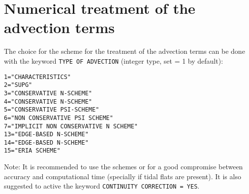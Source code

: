 \section{Numerical treatment of the advection terms}
The choice for the scheme for the treatment of the advection terms can be done with the keyword \texttt{TYPE OF ADVECTION} (integer type, set {\ttfamily = 1} by default):
\begin{lstlisting}[frame=trBL]  
1="CHARACTERISTICS" 
2="SUPG" 
3="CONSERVATIVE N-SCHEME"
4="CONSERVATIVE N-SCHEME"
5="CONSERVATIVE PSI-SCHEME"
6="NON CONSERVATIVE PSI SCHEME"
7="IMPLICIT NON CONSERVATIVE N SCHEME"
13="EDGE-BASED N-SCHEME"
14="EDGE-BASED N-SCHEME"
15="ERIA SCHEME"
\end{lstlisting}

\begin{WarningBlock}{Note:}
  It is recommended to use the schemes {} or {} for a good compromise between accuracy and computational time (specially if tidal flats are present). It is also suggested to active
  the keyword \texttt{CONTINUITY CORRECTION = YES}.
\end{WarningBlock}


